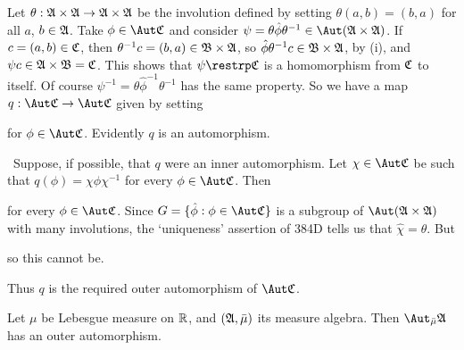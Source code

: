 {\medskip
     
 Let $\theta:\frak A\times\frak A\to\frak A\times\frak A$
be the involution defined by setting $\theta(a,b)=(b,a)$ for all $a$,
$b\in\frak A$.   Take $\phi\in\Aut\frak C$ and consider
$\psi=\theta\hat\phi\theta^{-1}\in\Aut(\frak A\times\frak A)$.   If
$c=(a,b)\in\frak C$, then  $\theta^{-1}c=(b,a)\in\frak B\times\frak A$,
so $\hat\phi\theta^{-1}c\in\frak B\times\frak A$, by (i), and $\psi
c\in\frak A\times\frak B=\frak C$.   This shows that
$\psi\restrp\frak{C}$
is a homomorphism from $\frak C$ to itself.   Of course
$\psi^{-1}=\theta\hat\phi^{-1}\theta^{-1}$ has the same property.   So
we have a map $q:\Aut\frak C\to\Aut\frak C$ given by setting
     
     
\noindent for $\phi\in\Aut\frak C$.   Evidently $q$ is an automorphism.
     
\medskip
     
 \Quer\ Suppose, if possible, that $q$ were an inner
automorphism.   Let $\chi\in\Aut\frak C$ be such that
$q(\phi)=\chi\phi\chi^{-1}$ for every $\phi\in\Aut\frak C$.   Then
     
     
\noindent for every $\phi\in\Aut\frak C$.   Since
$G=\{\hat\phi:\phi\in\Aut\frak C\}$ is a subgroup of
$\Aut(\frak A\times\frak A)$ with many involutions, the `uniqueness' assertion of 384D tells us that $\hat\chi=\theta$.   But
     
     
\noindent so this cannot be.\ \Bang
     
Thus $q$ is the required outer automorphism of $\Aut\frak C$.
}%
     
     
Let $\mu$ be Lebesgue measure on $\Bbb R$, and
$(\frak A,\bar\mu)$ its measure algebra.   Then $\Aut_{\bar\mu}\frak A$
has an outer automorphism.   
     
